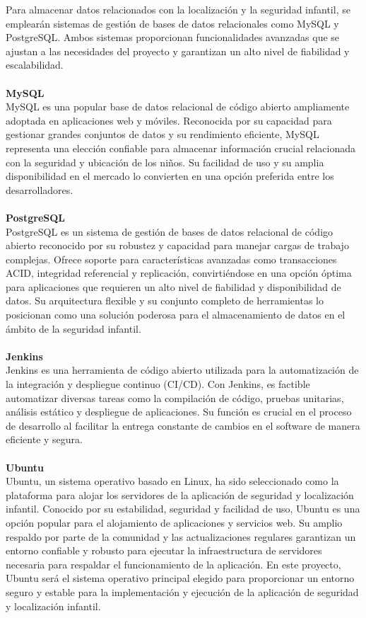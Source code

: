 \documentclass[12pt,onehalfspacing]{report}
\begin{document}
Para almacenar datos relacionados con la localización y la seguridad infantil, se emplearán sistemas de gestión de bases de datos relacionales como MySQL y PostgreSQL. Ambos sistemas proporcionan funcionalidades avanzadas que se ajustan a las necesidades del proyecto y garantizan un alto nivel de fiabilidad y escalabilidad.\\\\
\textbf{MySQL}\\
MySQL es una popular base de datos relacional de código abierto ampliamente adoptada en aplicaciones web y móviles. Reconocida por su capacidad para gestionar grandes conjuntos de datos y su rendimiento eficiente, MySQL representa una elección confiable para almacenar información crucial relacionada con la seguridad y ubicación de los niños. Su facilidad de uso y su amplia disponibilidad en el mercado lo convierten en una opción preferida entre los desarrolladores.\\\\
\textbf{PostgreSQL}\\
PostgreSQL es un sistema de gestión de bases de datos relacional de código abierto reconocido por su robustez y capacidad para manejar cargas de trabajo complejas. Ofrece soporte para características avanzadas como transacciones ACID, integridad referencial y replicación, convirtiéndose en una opción óptima para aplicaciones que requieren un alto nivel de fiabilidad y disponibilidad de datos. Su arquitectura flexible y su conjunto completo de herramientas lo posicionan como una solución poderosa para el almacenamiento de datos en el ámbito de la seguridad infantil.\\\\
\textbf{Jenkins}\\
Jenkins es una herramienta de código abierto utilizada para la automatización de la integración y despliegue continuo (CI/CD). Con Jenkins, es factible automatizar diversas tareas como la compilación de código, pruebas unitarias, análisis estático y despliegue de aplicaciones. Su función es crucial en el proceso de desarrollo al facilitar la entrega constante de cambios en el software de manera eficiente y segura.\\\\
\textbf{Ubuntu}\\
Ubuntu, un sistema operativo basado en Linux, ha sido seleccionado como la plataforma para alojar los servidores de la aplicación de seguridad y localización infantil. Conocido por su estabilidad, seguridad y facilidad de uso, Ubuntu es una opción popular para el alojamiento de aplicaciones y servicios web. Su amplio respaldo por parte de la comunidad y las actualizaciones regulares garantizan un entorno confiable y robusto para ejecutar la infraestructura de servidores necesaria para respaldar el funcionamiento de la aplicación. En este proyecto, Ubuntu será el sistema operativo principal elegido para proporcionar un entorno seguro y estable para la implementación y ejecución de la aplicación de seguridad y localización infantil.\\\\
\end{document}
